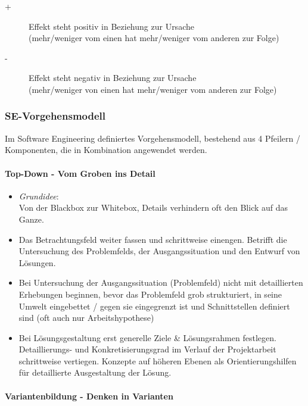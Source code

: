 \documentclass[a4paper]{article}
\begin{document}
			\begin{description}
				\item[+]Effekt steht positiv in Beziehung zur Ursache\\ 
							(mehr/weniger vom einen hat mehr/weniger vom anderen zur Folge) 
				\item[-] Effekt steht negativ in Beziehung zur Ursache\\
							(mehr/weniger von einen hat mehr/weniger vom anderen zur Folge)
			\end{description}
		
\newpage
		
		\subsubsection{SE-Vorgehensmodell}
	
		Im Software Engineering definiertes Vorgehensmodell, bestehend aus 4 Pfeilern / Komponenten, die in Kombination angewendet werden.
	
			\paragraph{Top-Down - Vom Groben ins Detail}
			
				\begin{itemize}
					\item \textit{Grundidee}:\\
					Von der Blackbox zur Whitebox, Details verhindern oft den Blick auf das Ganze.
					\item Das Betrachtungsfeld weiter fassen und schrittweise einengen.
					Betrifft die Untersuchung des Problemfelds, der Ausgangssituation und den Entwurf von Lösungen.
					\item Bei Untersuchung der Ausgangssituation (Problemfeld) nicht mit detaillierten Erhebungen beginnen, bevor das Problemfeld grob strukturiert, in seine Umwelt eingebettet / gegen sie eingegrenzt ist und Schnittstellen definiert sind (oft auch nur Arbeitshypothese)
					\item Bei Lösungsgestaltung erst generelle Ziele \& Lösungsrahmen festlegen.
					Detaillierungs- und Konkretisierungsgrad im Verlauf der Projektarbeit schrittweise vertiegen.
					Konzepte auf höheren Ebenen als Orientierungshilfen für detaillierte Ausgestaltung der Lösung.
				\end{itemize}
			
			\paragraph{Variantenbildung - Denken in Varianten}
			
\end{document}
